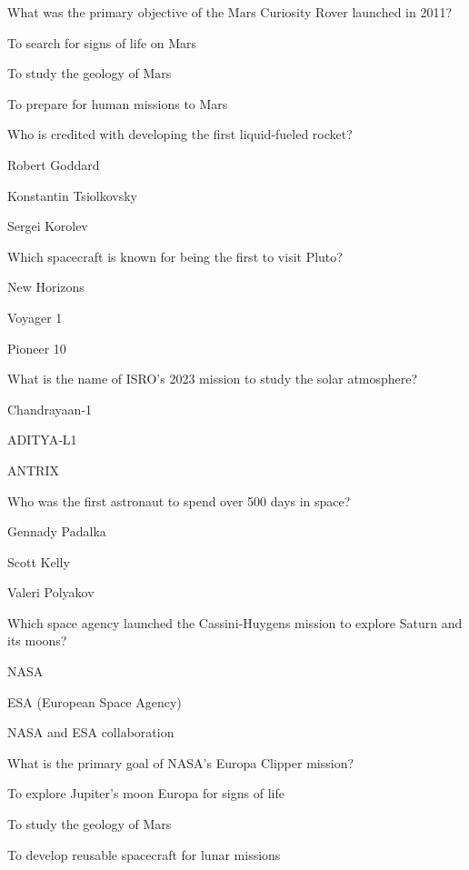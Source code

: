 \begin{enhancedmcq}{What was the primary objective of the Mars Curiosity Rover launched in 2011?}
\item To search for signs of life on Mars
\item To study the geology of Mars
\item To prepare for human missions to Mars

\end{enhancedmcq}
\begin{enhancedmcq}{Who is credited with developing the first liquid‑fueled rocket?}
\item Robert Goddard
\item Konstantin Tsiolkovsky
\item Sergei Korolev

\end{enhancedmcq}
\begin{enhancedmcq}{Which spacecraft is known for being the first to visit Pluto?}
\item New Horizons
\item Voyager 1
\item Pioneer 10

\end{enhancedmcq}
\begin{enhancedmcq}{What is the name of ISRO's 2023 mission to study the solar atmosphere?}
\item Chandrayaan‑1
\item ADITYA‑L1
\item ANTRIX

\end{enhancedmcq}
\begin{enhancedmcq}{Who was the first astronaut to spend over 500 days in space?}
\item Gennady Padalka
\item Scott Kelly
\item Valeri Polyakov

\end{enhancedmcq}
\begin{enhancedmcq}{Which space agency launched the Cassini‑Huygens mission to explore Saturn and its moons?}
\item NASA
\item ESA (European Space Agency)
\item NASA and ESA collaboration

\end{enhancedmcq}
\begin{enhancedmcq}{What is the primary goal of NASA's Europa Clipper mission?}
\item To explore Jupiter's moon Europa for signs of life
\item To study the geology of Mars
\item To develop reusable spacecraft for lunar missions
\end{enhancedmcq}